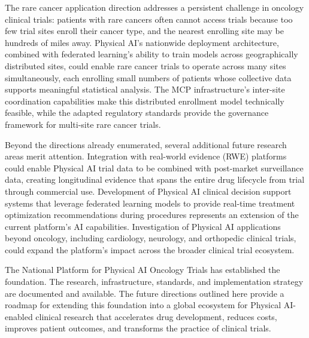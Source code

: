 The rare cancer application direction addresses a persistent challenge in
oncology clinical trials: patients with rare cancers often cannot access
trials because too few trial sites enroll their cancer type, and the nearest
enrolling site may be hundreds of miles away. Physical AI's nationwide
deployment architecture, combined with federated learning's ability to train
models across geographically distributed sites, could enable rare cancer
trials to operate across many sites simultaneously, each enrolling small
numbers of patients whose collective data supports meaningful statistical
analysis. The MCP infrastructure's inter-site coordination capabilities make
this distributed enrollment model technically feasible, while the adapted
regulatory standards provide the governance framework for multi-site rare
cancer trials.

Beyond the directions already enumerated, several additional future research
areas merit attention. Integration with real-world evidence (RWE) platforms
could enable Physical AI trial data to be combined with post-market
surveillance data, creating longitudinal evidence that spans the entire drug
lifecycle from trial through commercial use. Development of Physical AI
clinical decision support systems that leverage federated learning models to
provide real-time treatment optimization recommendations during procedures
represents an extension of the current platform's AI capabilities.
Investigation of Physical AI applications beyond oncology, including
cardiology, neurology, and orthopedic clinical trials, could expand the
platform's impact across the broader clinical trial ecosystem.

The National Platform for Physical AI Oncology Trials has established the
foundation. The research, infrastructure, standards, and implementation
strategy are documented and available. The future directions outlined here
provide a roadmap for extending this foundation into a global ecosystem for
Physical AI-enabled clinical research that accelerates drug development,
reduces costs, improves patient outcomes, and transforms the practice of
clinical trials.
